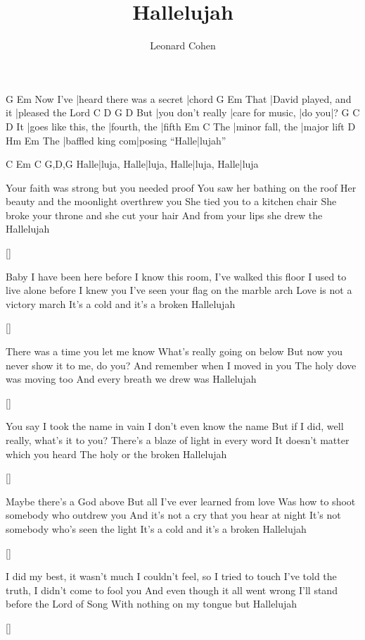 \documentclass{song}
\title{Hallelujah}
\author{Leonard Cohen}
\begin{document}
\begin{multicols}{2}

\strophe
         G                         Em
Now I've |heard there was a secret |chord
     G                     Em
That |David played, and it |pleased the Lord
    C                 D                G      D
But |you don't really |care for music, |do you|?
   G                    C            D
It |goes like this, the |fourth, the |fifth
    Em               C
The |minor fall, the |major lift
    D                Hm             Em
The |baffled king com|posing ``Halle|lujah''
\endstrophe

     C           Em          C           G,D,G
Halle|luja, Halle|luja, Halle|luja, Halle|luja
\endstrophe

\strophe
Your faith was strong but you needed proof
You saw her bathing on the roof
Her beauty and the moonlight overthrew you
She tied you to a kitchen chair
She broke your throne and she cut your hair
And from your lips she drew the Hallelujah
\endstrophe

\ref{}

\strophe*
Baby I have been here before
I know this room, I've walked this floor
I used to live alone before I knew you
I've seen your flag on the marble arch
Love is not a victory march
It's a cold and it's a broken Hallelujah
\endstrophe

\ref{}

\columnbreak

\strophe*
There was a time you let me know
What's really going on below
But now you never show it to me, do you?
And remember when I moved in you
The holy dove was moving too
And every breath we drew was Hallelujah
\endstrophe

\ref{}

\strophe*
You say I took the name in vain
I don't even know the name
But if I did, well really, what's it to you?
There's a blaze of light in every word
It doesn't matter which you heard
The holy or the broken Hallelujah
\endstrophe

\ref{}

\strophe*
Maybe there's a God above
But all I've ever learned from love
Was how to shoot somebody who outdrew you
And it's not a cry that you hear at night
It's not somebody who's seen the light
It's a cold and it's a broken Hallelujah
\endstrophe

\ref{}

\strophe*
I did my best, it wasn't much
I couldn't feel, so I tried to touch
I've told the truth, I didn't come to fool you
And even though it all went wrong
I'll stand before the Lord of Song
With nothing on my tongue but Hallelujah
\endstrophe

\ref{}

\end{multicols}
\end{document}
